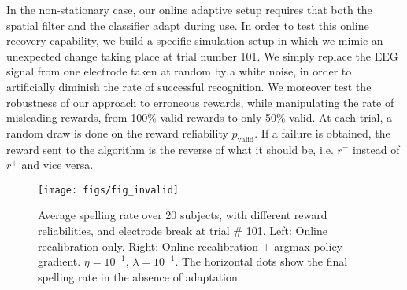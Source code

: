 \documentclass[conference]{IEEEtran}
\begin{document}
In the non-stationary case, our online adaptive setup requires that both the spatial filter and 
the classifier adapt during  use.
In order to test this online recovery capability, we build a specific simulation setup in which we mimic an unexpected 
change taking place at trial number 101. We simply replace the EEG signal from one electrode taken at random 
by a white noise, in order to artificially diminish the rate of successful recognition.
We moreover test the robustness of our approach to erroneous rewards, while manipulating
the rate of misleading rewards, from 100\% valid rewards to only 50\% valid.
At each trial, a random draw is done on the reward reliability $p_\text{valid}$. If a failure is obtained, 
the reward sent to the algorithm is the reverse of what it should be, i.e. $r^-$ instead of $r^+$ and vice versa.

\begin{figure}
\centerline{
 \texttt{[image: figs/fig\_invalid]}
}
\caption{Average spelling rate over 20 subjects, with different reward reliabilities, and electrode break
at trial \# 101. Left: Online recalibration only. Right: Online recalibration + argmax policy gradient.
$\eta = 10^{-1}$, $\lambda = 10^{-1}$. The horizontal dots show the final spelling rate in the absence of 
adaptation.}
\label{fig:invalid}
\end{figure}
\end{document}
